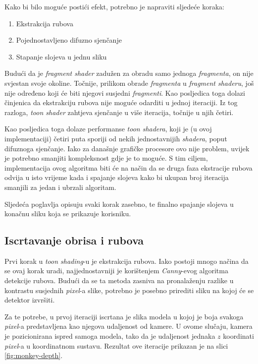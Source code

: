 Kako bi bilo moguće postići efekt, potrebno je napraviti sljedeće koraka:

\begin{enumerate}
\item Ekstrakcija rubova
\item Pojednostavljeno difuzno sjenčanje
\item Stapanje slojeva u jednu sliku
\end{enumerate}

Budući da je \emph{fragment shader} zadužen za obradu samo jednoga \emph{fragmenta}, on nije svjestan svoje okoline. Točnije, prilikom obrade \emph{fragmenta} u \emph{fragment shaderu}, još nije određeno koji će biti njegovi susjedni \emph{fragmenti}. Kao posljedica toga dolazi činjenica da ekstrakciju rubova nije moguće odarditi u jednoj iteraciji. Iz tog razloga, \emph{toon shader} zahtjeva sjenčanje u više iteracija, točnije u njih četiri.

Kao posljedica toga dolaze performanse \emph{toon shadera}, koji je (u ovoj implementaciji) četiri puta sporiji od nekih jednostavnijih \emph{shadera}, poput difuznoga sjenčanje. Iako za današnje grafičke procesore ovo nije problem, uvijek je potrebno smanjiti kompleksnost gdje je to moguće. S tim ciljem, implementacija ovog algoritma biti će na način da se druga faza ekstracije rubova odvija u isto vrijeme kada i spajanje slojeva kako bi ukupan broj iteracija smanjili za jedan i ubrzali algoritam.

Sljedeća poglavlja opisuju svaki korak zasebno, te finalno spajanje slojeva u konačnu sliku koja se prikazuje korisniku.

\subsection{Iscrtavanje obrisa i rubova}

Prvi korak u \emph{toon shading}-u je ekstrakcija rubova. Iako postoji mnogo načina da se ovaj korak uradi, najjednostavniji je korištenjem \emph{Canny}-evog algoritma detekcije rubova. Budući da se ta metoda zasniva na pronalaženju razlike u kontrastu susjednih \emph{pixel}-a slike, potrebno je posebno prirediti sliku na kojoj će se detektor izvršiti.

Za te potrebe, u prvoj iteraciji iscrtana je slika modela u kojoj je boja svakoga \emph{pixel}-a predstavljena kao njegova udaljenost od kamere. U ovome slučaju, kamera je pozicionirana ispred samoga modela, tako da je udaljenost jednaka $z$ koordinati \emph{pixel}-a u koordinatnom sustavu. Rezultat ove iteracije prikazan je na slici \ref{fig:monkey-depth}.

